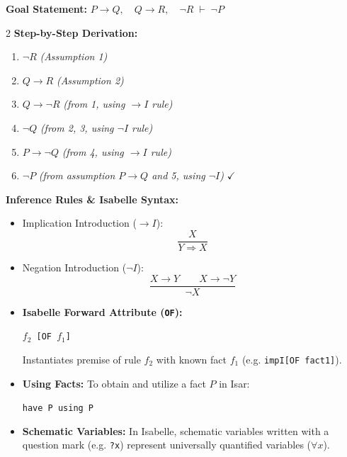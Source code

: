 \documentclass[10pt,a4paper]{article}
\begin{document}
\begin{tcolorbox}[title={2. Forward Reasoning Mechanics: Example Proof}]
\textbf{Goal Statement:} $P \rightarrow Q, \quad Q \rightarrow R, \quad \neg R \;\vdash\; \neg P$

\begin{multicols}{2}
\textbf{Step-by-Step Derivation:}
\begin{enumerate}[leftmargin=1.5em, itemsep=3pt]
    \item $\neg R$ \quad \textit{(Assumption 1)}
    \item $Q \rightarrow R$ \quad \textit{(Assumption 2)}
    \item $Q \rightarrow \neg R$ \quad \textit{(from 1, using $\rightarrow I$ rule)}
    \item $\neg Q$ \quad \textit{(from 2, 3, using $\neg I$ rule)}
    \item $P \rightarrow \neg Q$ \quad \textit{(from 4, using $\rightarrow I$ rule)}
    \item $\neg P$ \quad \textit{(from assumption $P \rightarrow Q$ and 5, using $\neg I$)} $\checkmark$
\end{enumerate}

\columnbreak

\textbf{Inference Rules \& Isabelle Syntax:}
\begin{itemize}[leftmargin=1.2em, itemsep=3pt]
    \item Implication Introduction ($\rightarrow I$):
    \[ \frac{X}{Y \Rightarrow X} \]
    \item Negation Introduction ($\neg I$):
    \[ \frac{X \rightarrow Y \qquad X \rightarrow \neg Y}{\neg X} \]
    \item \textbf{Isabelle Forward Attribute (\texttt{OF}):}
    \begin{center}
    \texttt{$f_2$ [OF $f_1$]}
    \end{center}
    Instantiates premise of rule $f_2$ with known fact $f_1$ (e.g. \texttt{impI[OF fact1]}).
\end{itemize}
\end{multicols}
\end{tcolorbox}

\vspace{0.3em}

\begin{tcolorbox}[title={3. Isabelle Forward Reasoning Notes}]
\begin{itemize}[leftmargin=1.2em, itemsep=3pt]
    \item \textbf{Using Facts:} To obtain and utilize a fact $P$ in Isar:
    \begin{center}
    \texttt{have P \quad using P}
    \end{center}
    \item \textbf{Schematic Variables:} In Isabelle, schematic variables written with a question mark (e.g. \texttt{?x}) represent universally quantified variables ($\forall x$).
\end{itemize}
\end{tcolorbox}
\end{document}
